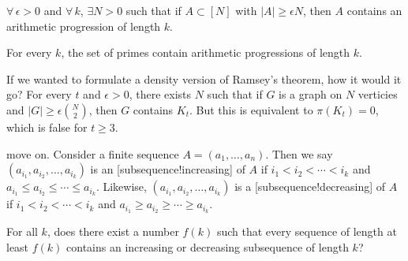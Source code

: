 \begin{theorem}
$\forall \, \epsilon>0$ and $\forall\, k$, $\exists N > 0$ such that if $A\subset [N]$ with $|A| \geq \epsilon N$, then $A$ contains an arithmetic progression of length $k$.
\end{theorem}


\begin{theorem}
For every $k$, the set of primes contain arithmetic progressions of length $k$. 
\end{theorem}


If we wanted to formulate a density version of Ramsey's theorem, how it would it go? For every $t$ and $\epsilon>0$, there exists $N$ such that if $G$ is a graph on $N$ verticies  and $|G|\geq \epsilon {N\choose 2}$, then $G$ contains $K_t$.
But this is equivalent to $\pi(K_t) = 0$, which is false for $t\geq 3$.

 move on. Consider a finite sequence $A=(a_1,\dotsc,a_n)$. Then we say $(a_{i_1},a_{i_2},\dotsc,a_{i_k})$ is an [subsequence!increasing] of $A$ if $i_1 < i_2 < \dotsb< i_k$ and $a_{i_1}\leq a_{i_2} \leq \dotsm \leq a_{i_k}$. Likewise, $(a_{i_1},a_{i_2},\dotsc,a_{i_k})$ is a [subsequence!decreasing] of $A$ if $i_1 < i_2 < \dotsb< i_k$ and $a_{i_1}\geq a_{i_2} \geq \dotsm \geq a_{i_k}$. 

\begin{problem}
For all $k$, does there exist a number $f(k)$ such that every sequence of length at least $f(k)$ contains an increasing or decreasing subsequence of length $k$?
\end{problem}


